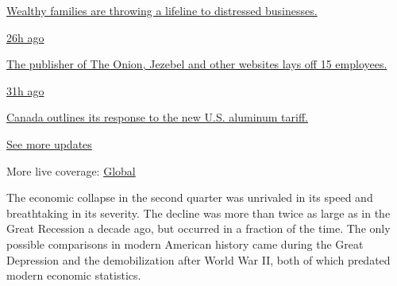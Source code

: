 \href{https://www.nytimes.com/live/2020/08/07/business/stock-market-today-coronavirus?action=click\&pgtype=Article\&state=default\&region=MAIN_CONTENT_1\&context=storylines_live_updates\#wealthy-families-are-throwing-a-lifeline-to-distressed-businesses}{Wealthy
families are throwing a lifeline to distressed businesses.}

\href{https://www.nytimes.com/live/2020/08/07/business/stock-market-today-coronavirus?action=click\&pgtype=Article\&state=default\&region=MAIN_CONTENT_1\&context=storylines_live_updates\#the-publisher-of-the-onion-jezebel-and-other-websites-lays-off-15-employees}{26h
ago}

\href{https://www.nytimes.com/live/2020/08/07/business/stock-market-today-coronavirus?action=click\&pgtype=Article\&state=default\&region=MAIN_CONTENT_1\&context=storylines_live_updates\#the-publisher-of-the-onion-jezebel-and-other-websites-lays-off-15-employees}{The
publisher of The Onion, Jezebel and other websites lays off 15
employees.}

\href{https://www.nytimes.com/live/2020/08/07/business/stock-market-today-coronavirus?action=click\&pgtype=Article\&state=default\&region=MAIN_CONTENT_1\&context=storylines_live_updates\#canada-outlines-its-response-to-the-new-us-aluminum-tariff}{31h
ago}

\href{https://www.nytimes.com/live/2020/08/07/business/stock-market-today-coronavirus?action=click\&pgtype=Article\&state=default\&region=MAIN_CONTENT_1\&context=storylines_live_updates\#canada-outlines-its-response-to-the-new-us-aluminum-tariff}{Canada
outlines its response to the new U.S. aluminum tariff.}

\href{https://www.nytimes.com/live/2020/08/07/business/stock-market-today-coronavirus?action=click\&pgtype=Article\&state=default\&region=MAIN_CONTENT_1\&context=storylines_live_updates}{See
more updates}

More live coverage:
\href{https://www.nytimes.com/2020/08/07/world/covid-19-news.html?action=click\&pgtype=Article\&state=default\&region=MAIN_CONTENT_1\&context=storylines_live_updates}{Global}

The economic collapse in the second quarter was unrivaled in its speed
and breathtaking in its severity. The decline was more than twice as
large as in the Great Recession a decade ago, but occurred in a fraction
of the time. The only possible comparisons in modern American history
came during the Great Depression and the demobilization after World War
II, both of which predated modern economic statistics.

